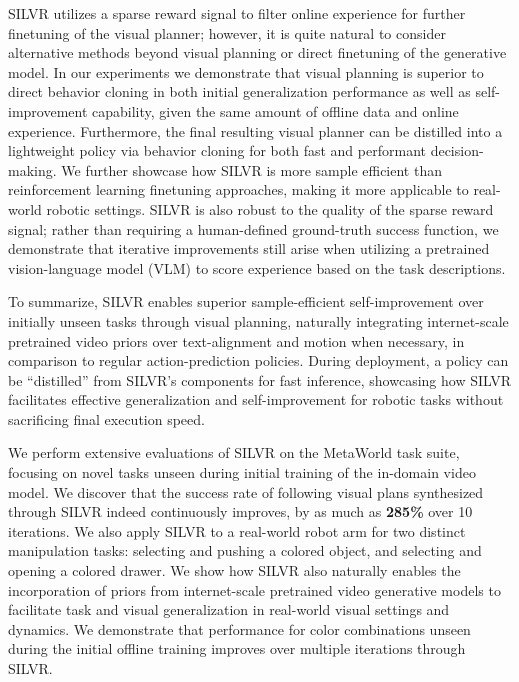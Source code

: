 SILVR utilizes a sparse reward signal to filter online experience for further finetuning of the visual planner; however, it is quite natural to consider alternative methods beyond visual planning or direct finetuning of the generative model.  In our experiments we demonstrate that visual planning is superior to direct behavior cloning in both initial generalization performance as well as self-improvement capability, given the same amount of offline data and online experience.  Furthermore, the final resulting visual planner can be distilled into a lightweight policy via behavior cloning for both fast and performant decision-making.  We further showcase how SILVR is more sample efficient than reinforcement learning finetuning approaches, making it more applicable to real-world robotic settings.  SILVR is also robust to the quality of the sparse reward signal; rather than requiring a human-defined ground-truth success function, we demonstrate that iterative improvements still arise when utilizing a pretrained vision-language model (VLM) to score experience based on the task descriptions.

To summarize, SILVR enables superior sample-efficient self-improvement over initially unseen tasks through visual planning, naturally integrating internet-scale pretrained video priors over text-alignment and motion when necessary, in comparison to regular action-prediction policies. %
During deployment, a policy can be ``distilled'' from SILVR's components for fast inference, showcasing how SILVR facilitates effective generalization and self-improvement for robotic tasks without sacrificing final execution speed.

We perform extensive evaluations of SILVR on the MetaWorld task suite, focusing on novel tasks unseen during initial training of the in-domain video model. We discover that the success rate of following visual plans synthesized through SILVR indeed continuously improves, by as much as \textbf{285\%} over 10 iterations.  We also apply SILVR to a real-world robot arm for two distinct manipulation tasks: selecting and pushing a colored object, and selecting and opening a colored drawer.  We show how SILVR also naturally enables the incorporation of priors from internet-scale pretrained video generative models to facilitate task and visual generalization in real-world visual settings and dynamics.  We demonstrate that performance for color combinations unseen during the initial offline training improves over multiple iterations through SILVR. 


